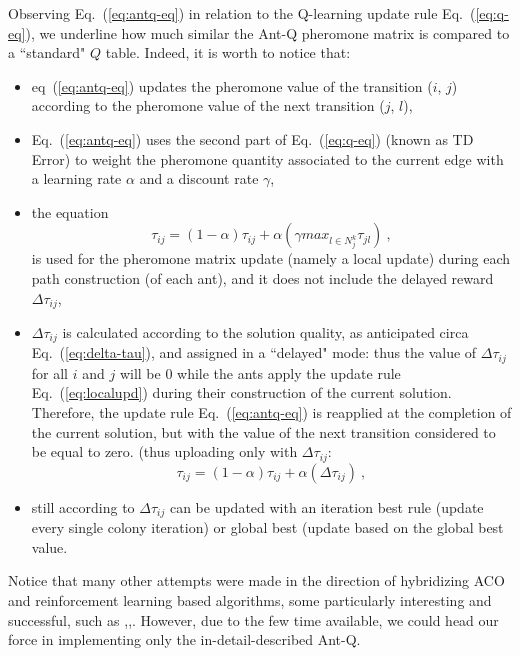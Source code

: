\documentclass[10pt]{article}
\begin{document}
Observing Eq.~(\ref{eq:antq-eq}) in relation to the Q-learning update rule Eq.~(\ref{eq:q-eq}), we underline how much similar the Ant-Q pheromone matrix is compared to a ``standard" $Q$ table. Indeed, it is worth to notice that:
\begin{itemize}
\item  eq~(\ref{eq:antq-eq})  updates the pheromone  value  of  the  transition  ($i$, $j$)  according to the  pheromone  value  of  the  next transition  ($j$, $ l$),
\item Eq.~(\ref{eq:antq-eq}) uses  the second part of Eq.~(\ref{eq:q-eq}) (known as TD Error) to  weight the  pheromone  quantity associated  to  the current  edge  with  a learning  rate $\alpha$  and  a discount  rate $\gamma$, 
\item the equation 
\begin{equation}
\tau_{ij}= (1-\alpha) \tau_{ij} + \alpha(\gamma max_{l\in N^k_j}\tau_{jl}) ~,
\label{eq:localupd}
\end{equation}
is used for the pheromone matrix update (namely a local update) during each path construction (of each ant), and it does not include the delayed reward $\Delta \tau_{ij}$,
\item $\Delta \tau_{ij}$ is calculated according to the solution quality, as anticipated circa Eq.~(\ref{eq:delta-tau}), and assigned in a ``delayed" mode: thus the value of $\Delta \tau_{ij}$  for all $i$ and $j$ will be $0$ while the ants  apply  the  update  rule Eq.~(\ref{eq:localupd})  during  their  construction  of the  current solution. 
Therefore, the update rule Eq.~(\ref{eq:antq-eq}) is reapplied at the completion of the current solution, but with the value of the next transition considered to be equal to zero. (thus uploading only with $\Delta \tau_{ij}$:
\begin{equation}
\tau_{ij}= (1-\alpha) \tau_{ij} + \alpha(\Delta\tau_{ij}) ~,
\label{eq:antq-delay}
\end{equation}

\item still according to \cite{undici} \cite{diciotto} $\Delta \tau_{ij}$ can be updated with an iteration  best  rule (update every single colony iteration) or  global  best (update based on the global best value.
\end{itemize}

Notice that many other attempts were made in the direction of hybridizing ACO and reinforcement learning based algorithms, some particularly interesting and successful, such as \cite{sedici},\cite{quattordici},\cite{quindici}. However, due to the few time available, we could head our force in implementing only the in-detail-described Ant-Q.
\end{document}
